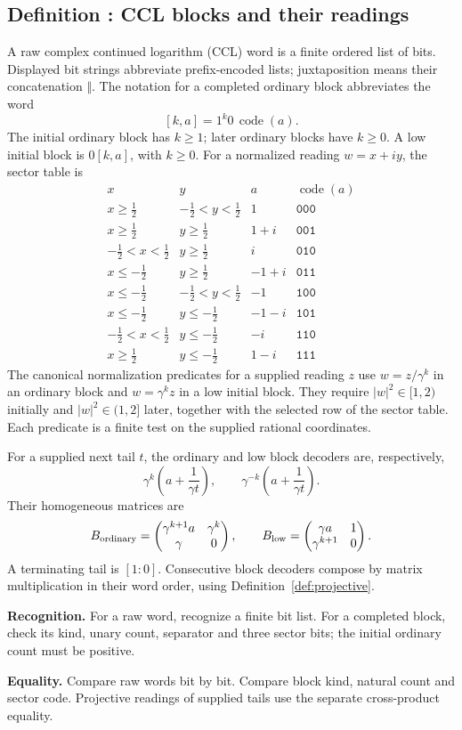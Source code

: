 \documentclass[11pt]{article}
\newcommand{\sq}[1]{\lvert #1\rvert^2}
\newcounter{definition}
\newcommand{\entry}[2]{%
  \refstepcounter{definition}\subsection*{#1 \thedefinition: #2}}
\newcommand{\definition}[1]{\entry{Definition}{#1}}
\newcommand{\checks}[2]{\begin{samepage}\par
  \textbf{Recognition.} #1\par\nopagebreak[4]
  \textbf{Equality.} #2\par\end{samepage}}
\begin{document}
\definition{CCL blocks and their readings}\label{def:blocks}
A raw complex continued logarithm (CCL) word is a finite ordered list of
bits. Displayed bit strings abbreviate prefix-encoded lists; juxtaposition
means their concatenation $\Vert$. The notation for a completed ordinary
block abbreviates the word
\[
                    [k,a]=1^k0\,\operatorname{code}(a).
\]
The initial ordinary block has $k\geq1$; later ordinary blocks have
$k\geq0$. A low initial block is $0[k,a]$, with $k\geq0$.
For a normalized reading $w=x+iy$, the sector table is
\begingroup
\renewcommand{\arraystretch}{1.25}
\[
\begin{array}{c|c|c|c}
x&y&a&\operatorname{code}(a)\\ \hline
x\geq\tfrac12&-\tfrac12<y<\tfrac12&1&\texttt{000}\\
x\geq\tfrac12&y\geq\tfrac12&1+i&\texttt{001}\\
-\tfrac12<x<\tfrac12&y\geq\tfrac12&i&\texttt{010}\\
x\leq-\tfrac12&y\geq\tfrac12&-1+i&\texttt{011}\\
x\leq-\tfrac12&-\tfrac12<y<\tfrac12&-1&\texttt{100}\\
x\leq-\tfrac12&y\leq-\tfrac12&-1-i&\texttt{101}\\
-\tfrac12<x<\tfrac12&y\leq-\tfrac12&-i&\texttt{110}\\
x\geq\tfrac12&y\leq-\tfrac12&1-i&\texttt{111}
\end{array}
\]
\endgroup
The canonical normalization predicates for a supplied reading $z$ use
$w=z/\gamma^k$ in an ordinary block and $w=\gamma^kz$ in a low initial
block. They require $\sq w\in[1,2)$ initially and $\sq w\in(1,2]$
later, together with the selected row of the sector table.
Each predicate is a finite test on the supplied rational coordinates.

For a supplied next tail $t$, the ordinary and low block decoders are,
respectively,
\[
        \gamma^k\left(a+\frac1{\gamma t}\right),
        \qquad
        \gamma^{-k}\left(a+\frac1{\gamma t}\right).
\]
Their homogeneous matrices are
\[
 B_{\rm ordinary}=
 \begin{pmatrix}\gamma^{k+1}a&\gamma^k\\\gamma&0\end{pmatrix},
 \qquad
 B_{\rm low}=
 \begin{pmatrix}\gamma a&1\\\gamma^{k+1}&0\end{pmatrix}.
\]
A terminating tail is $[1:0]$. Consecutive block decoders compose by matrix
multiplication in their word order, using Definition~\ref{def:projective}.
\checks{For a raw word, recognize a finite bit list. For a completed block,
check its kind, unary count, separator and three sector bits; the initial
ordinary count must be positive.}
{Compare raw words bit by bit. Compare block kind, natural count and
sector code. Projective readings of supplied tails use the separate
cross-product equality.}
\end{document}
